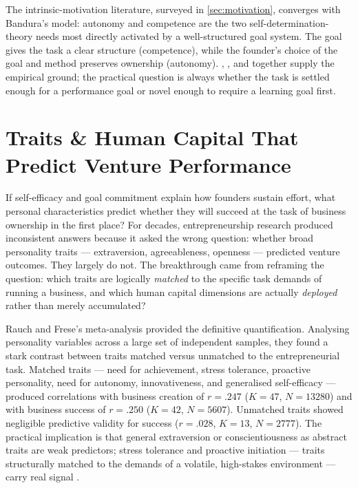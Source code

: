 The intrinsic-motivation literature, surveyed in \cref{sec:motivation}, converges with
Bandura's model: autonomy and competence are the two self-determination-theory needs most
directly activated by a well-structured goal system. The goal gives the task a clear structure
(competence), while the founder's choice of the goal and method preserves ownership (autonomy).
\textcite{bandura1997self}, \textcite{stajkovic1998self}, and \textcite{locke2002building}
together supply the empirical ground; the practical question is always whether the task is
settled enough for a performance goal or novel enough to require a learning goal first.

\section{Traits \& Human Capital That Predict Venture Performance}\label{sec:traits-human-capital}

If self-efficacy and goal commitment explain how founders sustain effort, what personal
characteristics predict whether they will succeed at the task of business ownership in the first
place? For decades, entrepreneurship research produced inconsistent answers because it asked the
wrong question: whether broad personality traits --- extraversion, agreeableness, openness ---
predicted venture outcomes. They largely do not. The breakthrough came from reframing the
question: which traits are logically \emph{matched} to the specific task demands of running a
business, and which human capital dimensions are actually \emph{deployed} rather than merely
accumulated?

Rauch and Frese's meta-analysis provided the definitive quantification. Analysing personality
variables across a large set of independent samples, they found a stark contrast between traits
matched versus unmatched to the entrepreneurial task. Matched traits --- need for achievement,
stress tolerance, proactive personality, need for autonomy, innovativeness, and generalised
self-efficacy --- produced correlations with business creation of $r = .247$ ($K = 47$,
$N = \num{13280}$) and with business success of $r = .250$ ($K = 42$, $N = \num{5607}$).
Unmatched traits showed negligible predictive validity for success ($r = .028$, $K = 13$,
$N = \num{2777}$). %
The practical implication is that general extraversion or conscientiousness as abstract traits
are weak predictors; stress tolerance and proactive initiation --- traits structurally matched to
the demands of a volatile, high-stakes environment --- carry real signal
\parencite{rauch2007person}.

